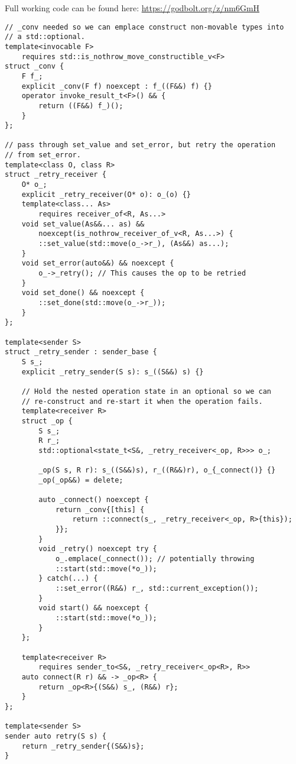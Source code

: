 \documentclass[a4paper,12pt,notitlepage,twoside,openright]{article}
\begin{document}
Full working code can be found here: \url{https://godbolt.org/z/nm6GmH}

\begin{verbatim}
// _conv needed so we can emplace construct non-movable types into
// a std::optional.
template<invocable F>
    requires std::is_nothrow_move_constructible_v<F>
struct _conv {
    F f_;
    explicit _conv(F f) noexcept : f_((F&&) f) {}
    operator invoke_result_t<F>() && {
        return ((F&&) f_)();
    }
};

// pass through set_value and set_error, but retry the operation
// from set_error.
template<class O, class R>
struct _retry_receiver {
    O* o_;
    explicit _retry_receiver(O* o): o_(o) {}
    template<class... As>
        requires receiver_of<R, As...>
    void set_value(As&&... as) &&
        noexcept(is_nothrow_receiver_of_v<R, As...>) {
        ::set_value(std::move(o_->r_), (As&&) as...);
    }
    void set_error(auto&&) && noexcept {
        o_->_retry(); // This causes the op to be retried
    }
    void set_done() && noexcept {
        ::set_done(std::move(o_->r_));
    }
};

template<sender S>
struct _retry_sender : sender_base {
    S s_;
    explicit _retry_sender(S s): s_((S&&) s) {}

    // Hold the nested operation state in an optional so we can
    // re-construct and re-start it when the operation fails.
    template<receiver R>
    struct _op {
        S s_;
        R r_;
        std::optional<state_t<S&, _retry_receiver<_op, R>>> o_;

        _op(S s, R r): s_((S&&)s), r_((R&&)r), o_{_connect()} {}
        _op(_op&&) = delete;

        auto _connect() noexcept {
            return _conv{[this] {
                return ::connect(s_, _retry_receiver<_op, R>{this});
            }};
        }
        void _retry() noexcept try {
            o_.emplace(_connect()); // potentially throwing
            ::start(std::move(*o_));
        } catch(...) {
            ::set_error((R&&) r_, std::current_exception());
        }
        void start() && noexcept {
            ::start(std::move(*o_));
        }
    };

    template<receiver R>
        requires sender_to<S&, _retry_receiver<_op<R>, R>>
    auto connect(R r) && -> _op<R> {
        return _op<R>{(S&&) s_, (R&&) r};
    }
};

template<sender S>
sender auto retry(S s) {
    return _retry_sender{(S&&)s};
}
\end{verbatim}
\end{document}
